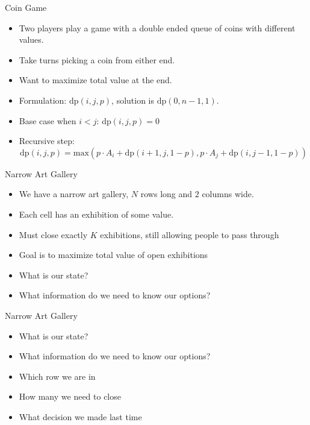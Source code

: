 \documentclass{beamer}
\begin{document}
\begin{frame}[plain]{Coin Game}
    \begin{itemize}
        \item<1-> Two players play a game with a double ended queue of coins with different values.
        \item<1-> Take turns picking a coin from either end.
        \item<1-> Want to maximize total value at the end.
        \item<2-> Formulation: $\mathrm{dp}(i, j, p)$, solution is $\mathrm{dp}(0, n-1, 1)$.
        \item<2-> Base case when $i < j$: $\mathrm{dp}(i, j, p) = 0$
        \item<2-> Recursive step: \[
                \scriptstyle{\mathrm{dp}(i, j, p) = \mathrm{max}\left(p \cdot A_i + \mathrm{dp}(i+1, j, 1-p), p \cdot A_j + \mathrm{dp}(i, j-1, 1-p)\right)}
            \]
    \end{itemize}
\end{frame}

\begin{frame}[plain]{Narrow Art Gallery}
    \begin{itemize}
        \item We have a narrow art gallery, $N$ rows long and $2$ columns wide.
        \item Each cell has an exhibition of some value.
        \item Must close exactly $K$ exhibitions, still allowing people to pass through
        \item Goal is to maximize total value of open exhibitions
        \item What is our state?
        \item What information do we need to know our options?
    \end{itemize}
\end{frame}

\begin{frame}[plain]{Narrow Art Gallery}
    \begin{itemize}
        \item<1-> What is our state?
        \item<1-> What information do we need to know our options?
        \item<2-> Which row we are in
        \item<3-> How many we need to close
        \item<4-> What decision we made last time
    \end{itemize}
\end{frame}
\end{document}
